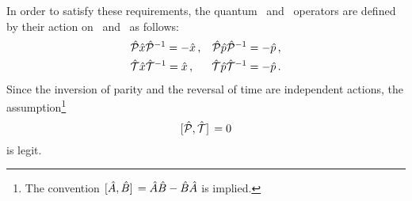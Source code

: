         In order to satisfy these requirements, the quantum \hP\ and \hT\ operators are defined by their action on \hx\ and \hp\ as follows:
        \begin{align}
            \label{eq:quantum-P}
            &\mathcal{\hat{P}}\hat{x}\mathcal{\hat{P}}^{-1} = -\hat{x}
            \,\text{,}
            &\mathcal{\hat{P}}\hat{p}\mathcal{\hat{P}}^{-1} = -\hat{p}
            \,\text{,}
            \\
            \label{eq:quantum-T}
            &\mathcal{\hat{T}}\hat{x}\mathcal{\hat{T}}^{-1} = \hat{x}
            \,\text{,}
            &\mathcal{\hat{T}}\hat{p}\mathcal{\hat{T}}^{-1} = -\hat{p}
            \,\text{.}
        \end{align}
        Since the inversion of parity and the reversal of time are independent actions, the assumption\footnote{The convention $\comm*{\hat{A}}{\hat{B}} = \hat{A}\hat{B} - \hat{B}\hat{A}$ is implied.}
        \begin{equation}
            \label{eq:PT-commutator}
            \comm*{\hP}{\hT} = 0 
        \end{equation}
        is legit.

